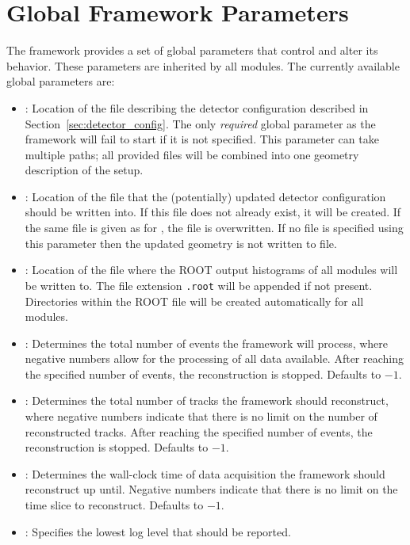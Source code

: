 \section{Global Framework Parameters}
\label{sec:framework_parameters}
The \corry framework provides a set of global parameters that control and alter its behavior. These parameters are inherited by all modules.
The currently available global parameters are:

\begin{itemize}
\item {}: Location of the file describing the detector configuration described in Section~\ref{sec:detector_config}.
The only \textit{required} global parameter as the framework will fail to start if it is not specified.
This parameter can take multiple paths; all provided files will be combined into one geometry description of the setup.
\item {}: Location of the file that the (potentially) updated detector configuration should be written into. If this file does not already exist, it will be created. If the same file is given as for , the file is overwritten. If no file is specified using this parameter then the updated geometry is not written to file.
\item {}: Location of the file where the ROOT output histograms of all modules will be written to. The file extension \texttt{.root} will be appended if not present. Directories within the ROOT file will be created automatically for all modules.
\item {}: Determines the total number of events the framework will process, where negative numbers allow for the processing of all data available.
After reaching the specified number of events, the reconstruction is stopped.
Defaults to $-1$.
\item {}: Determines the total number of tracks the framework should reconstruct, where negative numbers indicate that there is no limit on the number of reconstructed tracks.
After reaching the specified number of events, the reconstruction is stopped.
Defaults to $-1$.
\item {}: Determines the wall-clock time of data acquisition the framework should reconstruct up until. Negative numbers indicate that there is no limit on the time slice to reconstruct.
Defaults to $-1$.
\item {}: Specifies the lowest log level that should be reported.

\end{itemize}
